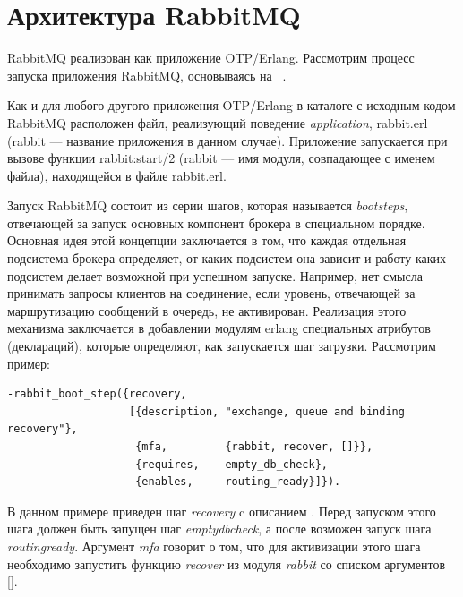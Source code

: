 \section{Архитектура RabbitMQ}
RabbitMQ реализован как приложение OTP/Erlang. Рассмотрим процесс запуска приложения RabbitMQ, основываясь на ~\cite{rabbit_boot_step}.\par Как и для любого другого приложения OTP/Erlang в каталоге с исходным кодом RabbitMQ расположен файл, реализующий поведение \textit{application}, rabbit.erl (rabbit --- название приложения в данном случае). Приложение запускается при вызове функции rabbit:start/2 (rabbit --- имя модуля, совпадающее с именем файла), находящейся в файле rabbit.erl.

Запуск RabbitMQ состоит из серии шагов, которая называется \textit{boot\thinspace steps}, отвечающей за запуск основных компонент брокера в специальном порядке. Основная идея этой концепции заключается в том, что каждая отдельная подсистема брокера определяет, от каких подсистем она зависит и работу каких подсистем делает возможной при успешном запуске. Например, нет смысла принимать запросы клиентов на соединение, если уровень, отвечающей за маршрутизацию сообщений в очередь, не активирован. Реализация этого механизма заключается в добавлении модулям erlang специальных атрибутов (деклараций),  которые определяют, как запускается шаг загрузки. Рассмотрим пример:
\begin{lstlisting}
-rabbit_boot_step({recovery,
                   [{description, "exchange, queue and binding recovery"},
                    {mfa,         {rabbit, recover, []}},
                    {requires,    empty_db_check},
                    {enables,     routing_ready}]}).
\end{lstlisting}
В данном примере приведен шаг \textit{recovery} c описанием . 
Перед запуском этого шага должен быть запущен шаг \textit{empty\underline{\hspace{0.25cm}}db\underline{\hspace{0.25cm}}check}, а после возможен запуск шага \textit{routing\underline{\hspace{0.25cm}}ready}. Аргумент \textit{mfa} говорит о том, что для активизации этого шага необходимо запустить функцию \textit{recover} из модуля \textit{rabbit} со списком аргументов [].

